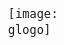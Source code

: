 %
% 
 

\newcommand \lersteSeite {
		
		\gorga \\
		{\fontsize {\gsgL}{\dls} \selectfont \gorgb} \\
		\gorgc \\	
		\texttt{[image: \\glogo]}
		{\fontsize {\gsgL}{\dls} \selectfont \gsempro} \\
		\gsem \\
		\gcsem\\
		
}


\neueSeite
	{\ohneKopzeile}
	{\zentriert}
	{\ohneTitel}
	{\lersteSeite}	